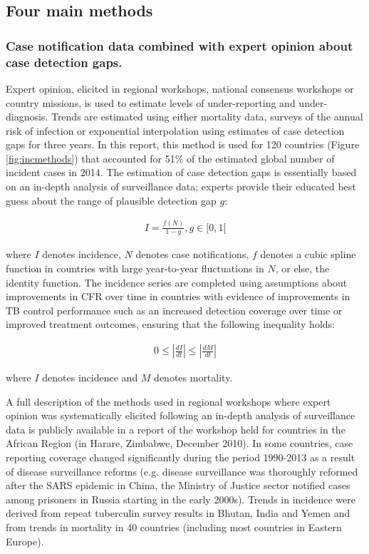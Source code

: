 \subsection {Four main methods}

\subsubsection {Case notification data combined with expert opinion about case detection gaps.} Expert opinion, elicited in regional workshops, national consensus workshops or country missions, is used to estimate levels of under-reporting and under-diagnosis. Trends are estimated using either mortality data, surveys of the annual risk of infection or exponential interpolation using estimates of case detection gaps for three years. In this report, this method is used for 120 countries (Figure \ref{fig:incmethods}) that accounted for 51\% of the estimated global number of incident cases in 2014. The estimation of case detection gaps is essentially based on an in-depth analysis of surveillance data; experts provide their educated best guess about the range of plausible detection gap $g$:

\begin{align*}
I=\frac{f(N)}{1-g}, g\in[0,1[
\end{align*}

where $I$ denotes incidence, $N$ denotes case notifications, $f$ denotes a cubic spline function in countries with large year-to-year fluctuations in $N$, or else, the identity function. The incidence series are completed using assumptions about improvements in CFR over time in countries with evidence of improvements in TB control performance such as an increased detection coverage over time or improved treatment outcomes, ensuring that the following inequality holds: 

\begin{align*}
0 \leq \left| \frac{dI}{dt} \right| \leq \left| \frac{dM}{dt} \right|
\end{align*}

where $I$ denotes incidence and $M$ denotes mortality.

A full description of the methods used in regional workshops where expert opinion was systematically elicited following an in-depth analysis of surveillance data is publicly available in a report of the workshop held for countries in the African Region (in Harare, Zimbabwe, December 2010\cite{WHO}). In some countries, case reporting coverage changed significantly during the period 1990-2013 as a result of disease surveillance reforms (e.g. disease surveillance was thoroughly reformed after the SARS epidemic in China, the Ministry of Justice sector notified cases among prisoners in Russia starting in the early 2000s). Trends in incidence were derived from repeat tuberculin survey results in Bhutan, India and Yemen and from trends in mortality in 40 countries (including most countries in Eastern Europe). 

